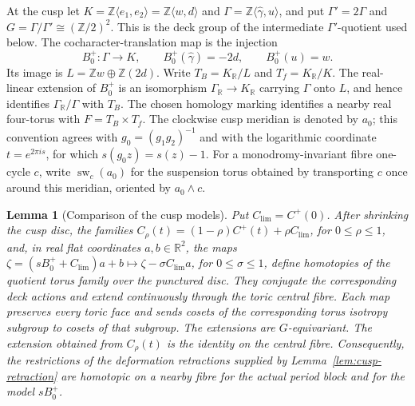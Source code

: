 \documentclass[11pt]{article}
\newtheorem{lemma}[theorem]{Lemma}
\theoremstyle{definition}
\theoremstyle{remark}
\numberwithin{equation}{section}
\begin{document}
At the cusp let
$K=\mathbb Z\langle e_1,e_2\rangle
=\mathbb Z\langle w,d\rangle$ and
$\Gamma=\mathbb Z\langle \widehat\gamma,u\rangle$,
and put $\Gamma'=2\Gamma$ and
$G=\Gamma/\Gamma'\cong(\mathbb Z/2)^2$.  This is the deck group of the
intermediate $\Gamma'$-quotient used below.  The cocharacter-translation
map is the injection
\begin{equation}\label{eq:cusp-B-marking}
 B_0^+:\Gamma\longrightarrow K,
 \qquad B_0^+(\widehat\gamma)=-2d,\qquad B_0^+(u)=w.
\end{equation}
Its image is
$L=\mathbb Zw\oplus\mathbb Z(2d)$.  Write
$T_B=K_{\mathbb R}/L$ and $T_f=K_{\mathbb R}/K$.
The real-linear extension of $B_0^+$ is an isomorphism
$\Gamma_{\mathbb R}\to K_{\mathbb R}$ carrying $\Gamma$ onto $L$, and
hence identifies $\Gamma_{\mathbb R}/\Gamma$ with $T_B$.
The chosen homology marking identifies a nearby real four-torus with
$F=T_B\times T_f$.  The
clockwise cusp meridian is denoted by $a_0$; this convention agrees with
$g_0=(g_1g_2)^{-1}$ and with the logarithmic coordinate
$t=e^{2\pi i s}$, for which $s(g_0z)=s(z)-1$.
For a monodromy-invariant fibre one-cycle $c$, write
$\operatorname{sw}_c(a_0)$ for the suspension torus obtained by
transporting $c$ once around this meridian, oriented by
$a_0\wedge c$.

\begin{lemma}[Comparison of the cusp models]
\label{lem:cusp-model-comparison}
Put $C_{\mathrm{lim}}=C^+(0)$.  After shrinking the cusp disc, the families
$C_\rho(t)=(1-\rho)C^+(t)+\rho C_{\mathrm{lim}}$, for
$0\leq\rho\leq1$, and, in real flat coordinates
$a,b\in\mathbb R^2$, the maps
$\zeta=(sB_0^++C_{\mathrm{lim}})a+b\longmapsto
\zeta-\sigma C_{\mathrm{lim}}a$, for $0\leq\sigma\leq1$,
define homotopies of the quotient torus family over the punctured disc.
They conjugate the corresponding deck actions and extend continuously
through the toric central fibre.  Each map preserves every toric face and
sends cosets of the corresponding torus isotropy subgroup to cosets of that
subgroup.  The extensions are $G$-equivariant.  The extension obtained from
$C_\rho(t)$ is the identity on the central fibre.  Consequently, the
restrictions of the
deformation retractions
supplied by
Lemma~\ref{lem:cusp-retraction} are homotopic on a nearby fibre for the actual
period block and for the model $sB_0^+$.
\end{lemma}
\end{document}
